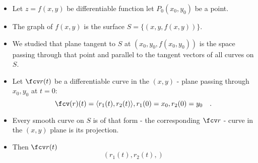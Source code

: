 \begin{frame}
\begin{itemize}
\item Let $z=f(x,y)$ be differentiable function let $P_0(x_0, y_0)$ be a point.
\item The graph of $f(x,y)$ is the surface $S=\{(x,y, f(x,y)) \} $.
\item We studied that plane tangent to $S$ at $(x_0, y_0, f(x_0 , y_0 ))$ is the space passing through that point and parallel to the tangent vectors of all curves on $S$.
\item Let $\fcv r(t)$ be a differentiable curve in the $(x,y)$ - plane passing through $x_0, y_0$ at $t=0$:
\[
\fcv (r)(t)= \langle r_1(t), r_2(t) \rangle, r_1(0)=x_0, r_2(0)=y_0\quad  .
\]
\item Every smooth curve on $S$ is of that form - the corresponding $\fcv r$ - curve in the $(x,y)$ plane is its projection.
\item Then $\fcv r(t)$
\[
(r_1(t), r_2(t), )
\]
\end{itemize} 

\end{frame}